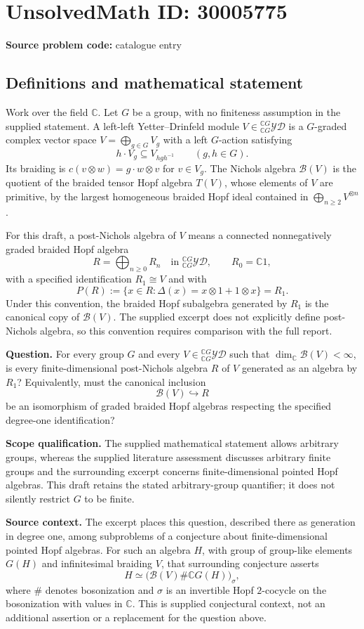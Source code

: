 \documentclass[11pt]{article}
\newcommand{\C}{\mathbb{C}}
\begin{document}
\section*{UnsolvedMath ID: 30005775}
\textbf{Source problem code:} catalogue entry
\subsection{Definitions and mathematical statement}
Work over the field \(\C\). Let \(G\) be a group, with no finiteness assumption in the supplied statement. A left-left Yetter--Drinfeld module \(V\in{}_{\C G}^{\C G}\mathcal{YD}\) is a \(G\)-graded complex vector space \(V=\bigoplus_{g\in G}V_g\) with a left \(G\)-action satisfying
\[
h\cdot V_g\subseteq V_{hgh^{-1}}\qquad(g,h\in G).
\]
Its braiding is \(c(v\otimes w)=g\cdot w\otimes v\) for \(v\in V_g\). The Nichols algebra \(\mathcal B(V)\) is the quotient of the braided tensor Hopf algebra \(T(V)\), whose elements of \(V\) are primitive, by the largest homogeneous braided Hopf ideal contained in \(\bigoplus_{n\ge2}V^{\otimes n}\).

For this draft, a post-Nichols algebra of \(V\) means a connected nonnegatively graded braided Hopf algebra
\[
R=\bigoplus_{n\ge0}R_n\quad\text{in }{}_{\C G}^{\C G}\mathcal{YD},\qquad R_0=\C 1,
\]
with a specified identification \(R_1\cong V\) and with
\[
P(R):=\{x\in R:\Delta(x)=x\otimes1+1\otimes x\}=R_1.
\]
Under this convention, the braided Hopf subalgebra generated by \(R_1\) is the canonical copy of \(\mathcal B(V)\). The supplied excerpt does not explicitly define post-Nichols algebra, so this convention requires comparison with the full report.

\textbf{Question.} For every group \(G\) and every \(V\in{}_{\C G}^{\C G}\mathcal{YD}\) such that \(\dim_{\C}\mathcal B(V)<\infty\), is every finite-dimensional post-Nichols algebra \(R\) of \(V\) generated as an algebra by \(R_1\)? Equivalently, must the canonical inclusion
\[
\mathcal B(V)\hookrightarrow R
\]
be an isomorphism of graded braided Hopf algebras respecting the specified degree-one identification?

\textbf{Scope qualification.} The supplied mathematical statement allows arbitrary groups, whereas the supplied literature assessment discusses arbitrary finite groups and the surrounding excerpt concerns finite-dimensional pointed Hopf algebras. This draft retains the stated arbitrary-group quantifier; it does not silently restrict \(G\) to be finite.

\textbf{Source context.} The excerpt places this question, described there as generation in degree one, among subproblems of a conjecture about finite-dimensional pointed Hopf algebras. For such an algebra \(H\), with group of group-like elements \(G(H)\) and infinitesimal braiding \(V\), that surrounding conjecture asserts
\[
H\simeq\bigl(\mathcal B(V)\#\C G(H)\bigr)_{\sigma},
\]
where \(\#\) denotes bosonization and \(\sigma\) is an invertible Hopf \(2\)-cocycle on the bosonization with values in \(\C\). This is supplied conjectural context, not an additional assertion or a replacement for the question above.
\end{document}
